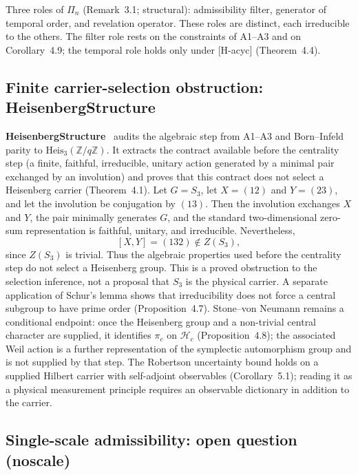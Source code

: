 \documentclass[11pt,a4paper]{article}
\theoremstyle{definition}
\newcommand{\Heis}{\mathrm{Heis}}
\newcommand{\Hc}{\mathcal{H}_c}
\newcommand{\pic}{\pi_c}
\begin{document}
      Three roles of $\Pi_n$ (Remark~3.1; structural):
      admissibility filter, generator of temporal order, and revelation operator.
      These roles are distinct, each irreducible to the others.  The filter role rests on the
      constraints of A1--A3 and on Corollary~4.9; the temporal role holds only under [H-acyc]
      (Theorem~4.4).

    \subsection{Finite carrier-selection obstruction: HeisenbergStructure}
      \label{sec:heisstr}
      \label{sec:hco}

      \textbf{HeisenbergStructure}~\cite{Beau2026HeisenbergStructure} audits the algebraic step from
      A1--A3 and Born--Infeld parity to $\Heis_3(\mathbb{Z}/q\mathbb{Z})$.
      It extracts the contract available before the centrality step (a finite, faithful,
      irreducible, unitary action generated by a minimal pair exchanged by an involution) and
      proves that this contract does not select a Heisenberg carrier (Theorem~4.1).
      Let $G=S_3$, let $X=(12)$ and $Y=(23)$, and let the involution be conjugation by
      $(13)$.  Then the involution exchanges $X$ and $Y$, the pair minimally generates $G$,
      and the standard two-dimensional zero-sum representation is faithful, unitary, and
      irreducible.  Nevertheless,
      \[
        [X,Y]=(132)\notin Z(S_3),
      \]
      since $Z(S_3)$ is trivial.  Thus the algebraic properties used before the centrality
      step do not select a Heisenberg group.  This is a proved obstruction to the selection
      inference, not a proposal that $S_3$ is the physical carrier.
      A separate application of Schur's lemma shows that irreducibility does not force a central
      subgroup to have prime order (Proposition~4.7).
      Stone--von Neumann remains a conditional endpoint: once the Heisenberg group and a
      non-trivial central character are supplied, it identifies $\pic$ on $\Hc$
      (Proposition~4.8); the associated Weil action is a further representation of the
      symplectic automorphism group and is not supplied by that step.
      The Robertson uncertainty bound holds on a supplied Hilbert carrier with self-adjoint
      observables (Corollary~5.1); reading it as a physical measurement principle requires an
      observable dictionary in addition to the carrier.

    \subsection{Single-scale admissibility: open question (noscale)}
      \label{sec:noscale}
\end{document}
